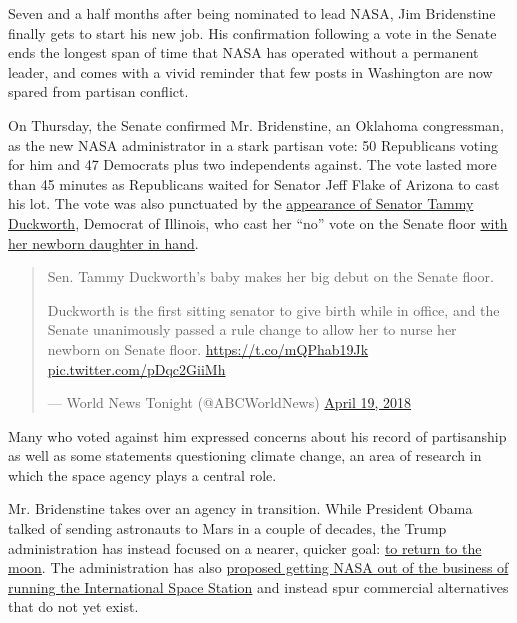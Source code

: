 Seven and a half months after being nominated to lead NASA, Jim
Bridenstine finally gets to start his new job. His confirmation
following a vote in the Senate ends the longest span of time that NASA
has operated without a permanent leader, and comes with a vivid reminder
that few posts in Washington are now spared from partisan conflict.

On Thursday, the Senate confirmed Mr. Bridenstine, an Oklahoma
congressman, as the new NASA administrator in a stark partisan vote: 50
Republicans voting for him and 47 Democrats plus two independents
against. The vote lasted more than 45 minutes as Republicans waited for
Senator Jeff Flake of Arizona to cast his lot. The vote was also
punctuated by the
\href{https://www.nytimes.com/2018/04/19/us/politics/baby-duckworth-senate-floor.html}{appearance
of Senator Tammy Duckworth}, Democrat of Illinois, who cast her ``no''
vote on the Senate floor
\href{https://twitter.com/LissandraVilla/status/987037761805930496}{with
her newborn daughter in hand}.

\begin{quote}
Sen. Tammy Duckworth's baby makes her big debut on the Senate floor.

Duckworth is the first sitting senator to give birth while in office,
and the Senate unanimously passed a rule change to allow her to nurse
her newborn on Senate floor. \url{https://t.co/mQPhab19Jk}
\href{https://t.co/pDqc2GiiMh}{pic.twitter.com/pDqc2GiiMh}

--- World News Tonight (@ABCWorldNews)
\href{https://twitter.com/ABCWorldNews/status/987049043779096576?ref_src=twsrc\%5Etfw}{April
19, 2018}
\end{quote}

Many who voted against him expressed concerns about his record of
partisanship as well as some statements questioning climate change, an
area of research in which the space agency plays a central role.

Mr. Bridenstine takes over an agency in transition. While President
Obama talked of sending astronauts to Mars in a couple of decades, the
Trump administration has instead focused on a nearer, quicker goal:
\href{https://www.nytimes.com/2017/12/11/science/trump-moon-space-directive.html}{to
return to the moon}. The administration has also
\href{https://www.nytimes.com/2018/02/11/science/nasa-budget-moon.html}{proposed
getting NASA out of the business of running the International Space
Station} and instead spur commercial alternatives that do not yet exist.

